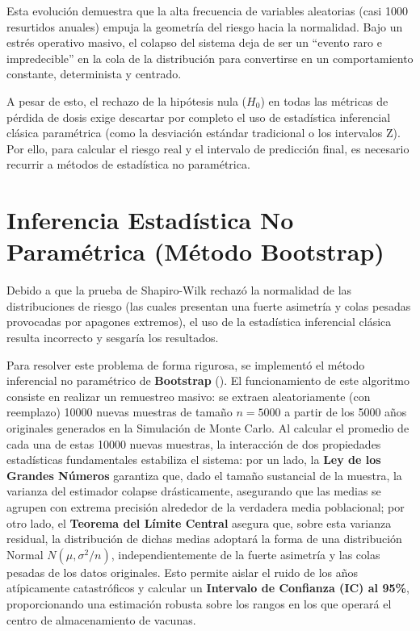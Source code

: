 \documentclass[
  spanish,
  us-letterpaper,
]{scrreprt}
\numberwithin{equation}{section}
\theoremstyle{plain}
\theoremstyle{plain}
\theoremstyle{definition}
\theoremstyle{plain}
\theoremstyle{remark}
\begin{document}
Esta evolución demuestra que la alta frecuencia de variables aleatorias
(casi 1000 resurtidos anuales) empuja la geometría del riesgo hacia la
normalidad. Bajo un estrés operativo masivo, el colapso del sistema deja
de ser un ``evento raro e impredecible'' en la cola de la distribución
para convertirse en un comportamiento constante, determinista y
centrado.

A pesar de esto, el rechazo de la hipótesis nula (\(H_0\)) en todas las
métricas de pérdida de dosis exige descartar por completo el uso de
estadística inferencial clásica paramétrica (como la desviación estándar
tradicional o los intervalos Z). Por ello, para calcular el riesgo real
y el intervalo de predicción final, es necesario recurrir a métodos de
estadística no paramétrica.

\section{Inferencia Estadística No Paramétrica (Método
Bootstrap)}\label{inferencia-estaduxedstica-no-paramuxe9trica-muxe9todo-bootstrap}

Debido a que la prueba de Shapiro-Wilk rechazó la normalidad de las
distribuciones de riesgo (las cuales presentan una fuerte asimetría y
colas pesadas provocadas por apagones extremos), el uso de la
estadística inferencial clásica resulta incorrecto y sesgaría los
resultados.

Para resolver este problema de forma rigurosa, se implementó el método
inferencial no paramétrico de \textbf{Bootstrap}
(). El
funcionamiento de este algoritmo consiste en realizar un remuestreo
masivo: se extraen aleatoriamente (con reemplazo) 10000 nuevas muestras
de tamaño \(n = 5000\) a partir de los 5000 años originales generados en
la Simulación de Monte Carlo. Al calcular el promedio de cada una de
estas 10000 nuevas muestras, la interacción de dos propiedades
estadísticas fundamentales estabiliza el sistema: por un lado, la
\textbf{Ley de los Grandes Números} garantiza que, dado el tamaño
sustancial de la muestra, la varianza del estimador colapse
drásticamente, asegurando que las medias se agrupen con extrema
precisión alrededor de la verdadera media poblacional; por otro lado, el
\textbf{Teorema del Límite Central} asegura que, sobre esta varianza
residual, la distribución de dichas medias adoptará la forma de una
distribución Normal \(N(\mu, \sigma^2/n)\), independientemente de la
fuerte asimetría y las colas pesadas de los datos originales. Esto
permite aislar el ruido de los años atípicamente catastróficos y
calcular un \textbf{Intervalo de Confianza (IC) al 95\%}, proporcionando
una estimación robusta sobre los rangos en los que operará el centro de
almacenamiento de vacunas.
\end{document}
